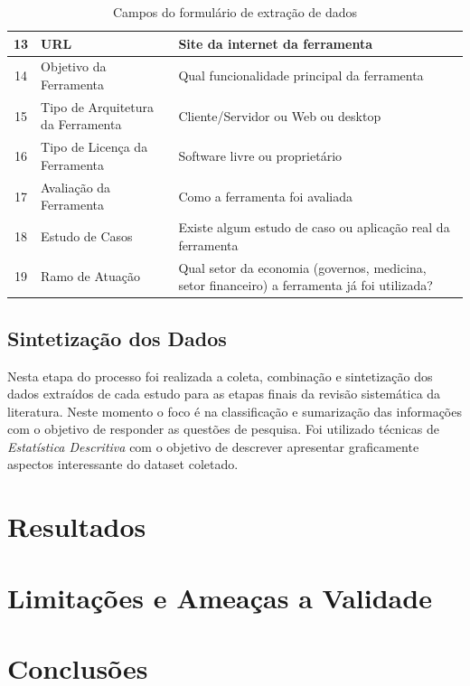 \documentclass[12pt]{article}
\begin{document}
\begin{table}[ht]
{\begin{tabular}{|c|l|l|}
13          & URL                                    & Site da internet da ferramenta                                                               \\ \hline
14          & Objetivo da Ferramenta                 & Qual funcionalidade principal da ferramenta                                                  \\ \hline
15          & Tipo de Arquitetura da Ferramenta      & Cliente/Servidor ou Web ou desktop                                                           \\ \hline
16          & Tipo de Licença da Ferramenta          & Software livre ou proprietário                                                               \\ \hline
17          & Avaliação da Ferramenta                & Como a ferramenta foi avaliada                                                               \\ \hline
18          & Estudo de Casos                        & Existe algum estudo de caso ou aplicação real da ferramenta                                  \\ \hline
19          & Ramo de Atuação                          & Qual setor da economia (governos, medicina, setor financeiro) a ferramenta já foi utilizada? \\ \hline
\end{tabular}
}
\caption{Campos do formulário de extração de dados}
\label{tab:campos-form}
\end{table}



\subsection{Sintetização dos Dados}
\label{subsec:sintetizacao}
Nesta etapa do processo foi realizada a coleta, combinação e sintetização dos
dados extraídos de cada estudo  para as etapas finais da revisão sistemática da
literatura. Neste momento o foco é na classificação e sumarização das
informações com o objetivo de responder as questões de pesquisa. Foi utilizado
técnicas de \textit{Estatística Descritiva} \cite{wohlin2012experimentation} com o objetivo de descrever
apresentar graficamente aspectos interessante do dataset coletado.
\section{Resultados}
\label{subsec:resultados}

\section{Limitações e Ameaças a Validade}
\label{sec:limitacoes}

\section{Conclusões}
\label{sec:conclusao}



\end{document}
